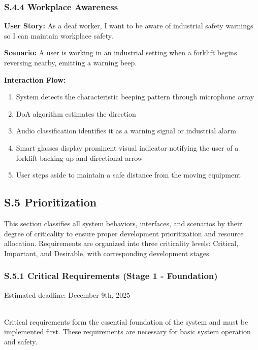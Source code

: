 \documentclass[12pt]{article}
\theoremstyle{definition}
\begin{document}
\subsubsection{S.4.4 Workplace Awareness}
\textbf{User Story:} As a deaf worker, I want to be aware of industrial safety warnings so I can maintain workplace safety.

\textbf{Scenario:} A user is working in an industrial setting when a forklift begins reversing nearby, emitting a warning beep.

\textbf{Interaction Flow:}
\begin{enumerate}
    \item System detects the characteristic beeping pattern through microphone array
    \item DoA algorithm estimates the direction
    \item Audio classification identifies it as a warning signal or industrial alarm
    \item Smart glasses display prominent visual indicator notifying the user of a forklift backing up and directional arrow
    \item User steps aside to maintain a safe distance from the moving equipment
\end{enumerate}

\subsection{S.5 Prioritization}

This section classifies all system behaviors, interfaces, and scenarios by their degree of criticality to ensure proper development prioritization and resource allocation. Requirements are organized into three criticality levels: Critical, Important, and Desirable, with corresponding development stages.

\subsubsection{S.5.1 Critical Requirements (Stage 1 - Foundation)}

Estimated deadline: December 9th, 2025

\\

Critical requirements form the essential foundation of the system and must be implemented first. These requirements are necessary for basic system operation and safety.
\end{document}
